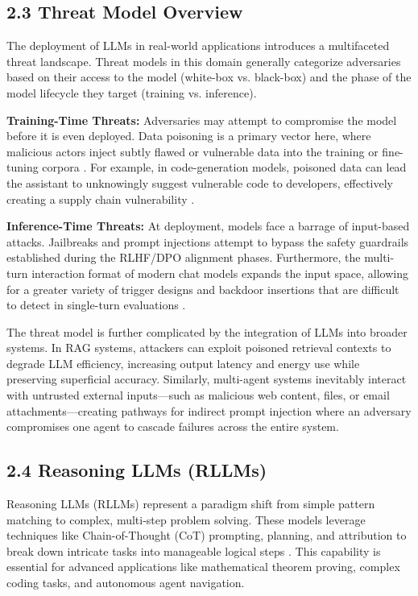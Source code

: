 \documentclass[11pt,a4paper]{article}
\begin{document}
\subsection{2.3 Threat Model Overview}

The deployment of LLMs in real-world applications introduces a multifaceted threat landscape. Threat models in this domain generally categorize adversaries based on their access to the model (white-box vs. black-box) and the phase of the model lifecycle they target (training vs. inference).

\textbf{Training-Time Threats:} Adversaries may attempt to compromise the model before it is even deployed. Data poisoning is a primary vector here, where malicious actors inject subtly flawed or vulnerable data into the training or fine-tuning corpora \cite{Rubel_2024_LLM}. For example, in code-generation models, poisoned data can lead the assistant to unknowingly suggest vulnerable code to developers, effectively creating a supply chain vulnerability \cite{Rubel_2024_LLM}. 

\textbf{Inference-Time Threats:} At deployment, models face a barrage of input-based attacks. Jailbreaks and prompt injections attempt to bypass the safety guardrails established during the RLHF/DPO alignment phases. Furthermore, the multi-turn interaction format of modern chat models expands the input space, allowing for a greater variety of trigger designs and backdoor insertions that are difficult to detect in single-turn evaluations \cite{Hao_2024_Exploring}. 

The threat model is further complicated by the integration of LLMs into broader systems. In RAG systems, attackers can exploit poisoned retrieval contexts to degrade LLM efficiency, increasing output latency and energy use while preserving superficial accuracy. Similarly, multi-agent systems inevitably interact with untrusted external inputs---such as malicious web content, files, or email attachments---creating pathways for indirect prompt injection where an adversary compromises one agent to cascade failures across the entire system.

\subsection{2.4 Reasoning LLMs (RLLMs)}

Reasoning LLMs (RLLMs) represent a paradigm shift from simple pattern matching to complex, multi-step problem solving. These models leverage techniques like Chain-of-Thought (CoT) prompting, planning, and attribution to break down intricate tasks into manageable logical steps \cite{Wang_2024_LLM}. This capability is essential for advanced applications like mathematical theorem proving, complex coding tasks, and autonomous agent navigation.
\end{document}
